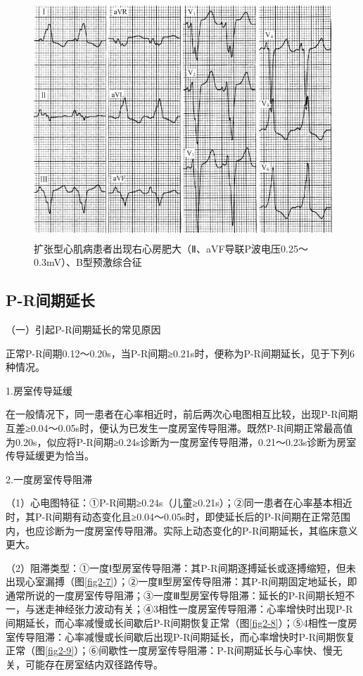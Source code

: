 \begin{figure}[!htbp]
 \centering
 \includegraphics[width=4.64583in,height=3.53125in]{./images/Image00041.jpg}
 \captionsetup{justification=centering}
 \caption{扩张型心肌病患者出现右心房肥大（Ⅱ、aVF导联P波电压0.25～0.3mV）、B型预激综合征}
 \label{fig2-6}
  \end{figure} 

\protect\hypertarget{text00008.htmlux5cux23subid32}{}{}

\subsection{P-R间期延长}

（一）引起P-R间期延长的常见原因

正常P-R间期0.12～0.20s，当P-R间期≥0.21s时，便称为P-R间期延长，见于下列6种情况。

1.房室传导延缓

在一般情况下，同一患者在心率相近时，前后两次心电图相互比较，出现P-R间期互差≥0.04～0.05s时，便认为已发生一度房室传导阻滞。既然P-R间期正常最高值为0.20s，似应将P-R间期≥0.24s诊断为一度房室传导阻滞，0.21～0.23s诊断为房室传导延缓更为恰当。

2.一度房室传导阻滞

（1）心电图特征：①P-R间期≥0.24s（儿童≥0.21s）；②同一患者在心率基本相近时，其P-R间期有动态变化且≥0.04～0.05s时，即使延长后的P-R间期在正常范围内，也应诊断为一度房室传导阻滞。实际上动态变化的P-R间期延长，其临床意义更大。

（2）阻滞类型：①一度Ⅰ型房室传导阻滞：其P-R间期逐搏延长或逐搏缩短，但未出现心室漏搏（图\ref{fig2-7}）；②一度Ⅱ型房室传导阻滞：其P-R间期固定地延长，即通常所说的一度房室传导阻滞；③一度Ⅲ型房室传导阻滞：延长的P-R间期长短不一，与迷走神经张力波动有关；④3相性一度房室传导阻滞：心率增快时出现P-R间期延长，而心率减慢或长间歇后P-R间期恢复正常（图\ref{fig2-8}）；⑤4相性一度房室传导阻滞：心率减慢或长间歇后出现P-R间期延长，而心率增快时P-R间期恢复正常（图\ref{fig2-9}）；⑥间歇性一度房室传导阻滞：P-R间期延长与心率快、慢无关，可能存在房室结内双径路传导。

